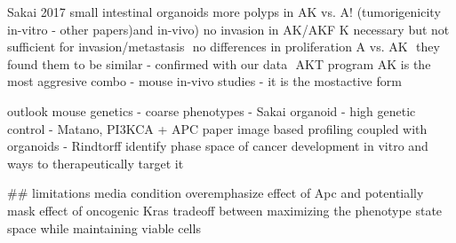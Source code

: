 Sakai 2017
small intestinal organoids more polyps in AK vs. A! (tumorigenicity in-vitro - other papers)and in-vivo) no invasion in AK/AKF K necessary but not sufficient for invasion/metastasis  no differences in proliferation A vs. AK  they found them to be similar - confirmed with our data  AKT program AK is the most aggresive combo - mouse in-vivo studies - it is the mostactive form

outlook 
mouse genetics - coarse phenotypes  - Sakai
organoid - high genetic control - Matano, PI3KCA + APC paper
image based profiling coupled with organoids - Rindtorff
identify phase space of cancer development in vitro and ways to therapeutically target it


## limitations
media condition overemphasize effect of Apc and potentially mask effect of oncogenic Kras
tradeoff between maximizing the phenotype state space while maintaining viable cells 